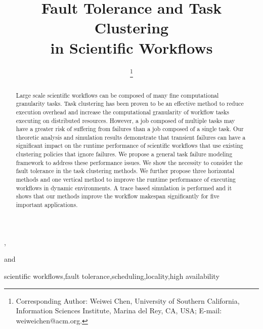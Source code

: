 \documentclass{IOS-Book-Article}
\begin{document}
\begin{frontmatter}              %

\title{Fault Tolerance and Task Clustering\\
 in Scientific Workflows}

\author[A]{ %
\thanks{Corresponding Author: Weiwei Chen, University of Southern California, Information Sciences Institute, Marina del Rey, CA, USA; E-mail:
weiweichen@acm.org.}},
\author[A]{ }
and
\author[A]{ }

\address[A]{University of Southern California, Information Sciences Institute, Marina del Rey, CA, USA}

\begin{abstract}
Large scale scientific workflows can be composed of many fine computational granularity tasks. Task clustering has been proven to be an effective method to reduce execution overhead and increase the computational granularity of workflow tasks executing on distributed resources. However, a job composed of multiple tasks may have a greater risk of suffering from failures than a job composed of a single task. Our theoretic analysis and simulation results demonstrate that transient failures can have a significant impact on the runtime performance of scientific workflows that use existing clustering policies that ignore failures. We propose a general task failure modeling framework to address these performance issues. We show the necessity to consider the fault tolerance in the task clustering methods.  We further propose three horizontal methods and one vertical method to improve the runtime performance of executing workflows in dynamic environments. A trace based simulation is performed and it shows that our methods improve the workflow makespan significantly for five important applications.    
\end{abstract}

\begin{keyword}
scientific workflows\sep fault tolerance\sep scheduling\sep locality\sep high availability 
\end{keyword}
\end{frontmatter}

\thispagestyle{empty}
\pagestyle{empty}
\end{document}
